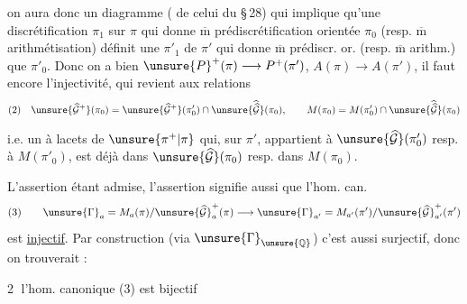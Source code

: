on aura donc un diagramme ( de celui du \S\,28)
qui  implique qu'une discrétification $\pi_1$ sur $\pi$ qui donne $\overline{\mathrm m}$ prédiscrétification orientée  $\pi_0$ (resp. $\overline{\mathrm m}$ arithmétisation) définit une  $\pi'_1$ de $\pi'$ qui donne $\overline{\mathrm m}$ prédiscr. or. (resp. $\overline{\mathrm m}$ arithm.) que $\pi'_0$. Donc on a bien $\unsure{P}^{+}(\pi)\longrightarrow P^+(\pi')$, $A(\pi)\longrightarrow A(\pi')$, il faut encore  l'injectivité, qui revient aux relations
\[
\begin{gathered}
(2)\quad
\unsure{\widehat{\mathcal G}^{+}}(\pi_0)
=
\unsure{\widehat{\mathcal G}^{+}}(\pi'_0)\cap
\unsure{\widehat{\widehat{\mathcal G}}}(\pi_0),\qquad
M(\pi_0)=M(\pi'_0)\cap
\unsure{\widehat{\widehat{\mathcal G}}}(\pi_0)
\end{gathered}
\]

i.e. un  à lacets de $\unsure{\pi^{+}|\pi}$ qui, sur $\pi'$, appartient à $\unsure{\widehat{\mathcal G}}(\pi'_0)$  resp. à $M(\pi'_0)$, est déjà dans $\unsure{\widehat{\mathcal G}}(\pi_0)$ resp. dans $M(\pi_0)$.

L'assertion   étant admise, l'assertion   signifie aussi que l'hom. can.
\[
(3)\qquad
\unsure{\Gamma}_a=M_a(\pi)/\unsure{\widehat{\mathcal G}}^{+}_a(\pi)
\longrightarrow
\unsure{\Gamma}_{a'}=M_{a'}(\pi')/\unsure{\widehat{\mathcal G}}^{+}_{a'}(\pi')
\]
est \uline{injectif}. Par construction (via $\unsure{\Gamma}_{\unsure{\mathbb Q}}$) c'est aussi surjectif, donc on trouverait :

\textcircled{2} l'hom. canonique (3) est bijectif

